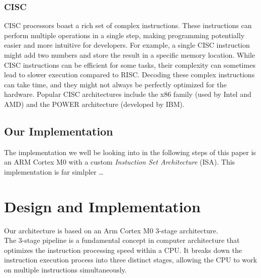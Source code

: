 \documentclass[9pt,a4paper,twoside]{tau}
\begin{document}
        \subsubsection{CISC}
        CISC processors boast a rich set of complex instructions. These instructions can perform multiple operations in a single step, making programming potentially easier and more intuitive for developers. For example, a single CISC instruction might add two numbers and store the result in a specific memory location. While CISC instructions can be efficient for some tasks, their complexity can sometimes lead to slower execution compared to RISC. Decoding these complex instructions can take time, and they might not always be perfectly optimized for the hardware. Popular CISC architectures include the x86 family (used by Intel and AMD) and the POWER architecture (developed by IBM).

    \subsection{Our Implementation}
    The implementation we well be looking into in the following steps of this paper is an ARM Cortex M0 with a custom \textit{Instuction Set Architecture} (ISA). This implementation is far simlpler \dots
    
    

\section{Design and Implementation}
    Our architecture is based on an Arm Cortex M0 3-stage architecture.\\
    The 3-stage pipeline is a fundamental concept in computer architecture that optimizes the instruction processing speed within a CPU. It breaks down the instruction execution process into three distinct stages, allowing the CPU to work on multiple instructions simultaneously.\\
\end{document}
